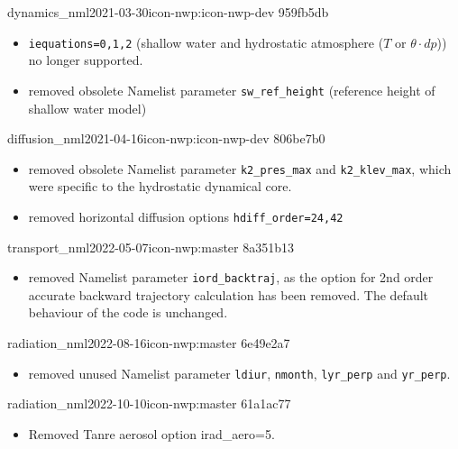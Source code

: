 \begin{changeitem}{dynamics\_nml}{2021-03-30}{icon-nwp:icon-nwp-dev 959fb5db}
  \begin{itemize}
   \item \texttt{iequations=0,1,2} (shallow water and hydrostatic atmosphere ($T$ or $\theta\cdot dp$)) no longer supported.
   \item removed obsolete Namelist parameter \texttt{sw\_ref\_height} (reference height of shallow water model)
  \end{itemize}
\end{changeitem}

\begin{changeitem}{diffusion\_nml}{2021-04-16}{icon-nwp:icon-nwp-dev 806be7b0}
  \begin{itemize}
   \item removed obsolete Namelist parameter \texttt{k2\_pres\_max} and \texttt{k2\_klev\_max}, which were specific to the hydrostatic dynamical core.
   \item removed horizontal diffusion options \texttt{hdiff\_order=24,42}
  \end{itemize}
\end{changeitem}

\begin{changeitem}{transport\_nml}{2022-05-07}{icon-nwp:master 8a351b13}
  \begin{itemize}
   \item removed Namelist parameter \texttt{iord\_backtraj}, as the option for 2nd order accurate backward trajectory calculation has been removed.
         The default behaviour of the code is unchanged.
  \end{itemize}
\end{changeitem}

\begin{changeitem}{radiation\_nml}{2022-08-16}{icon-nwp:master 6e49e2a7}
  \begin{itemize}
   \item removed unused Namelist parameter \texttt{ldiur}, \texttt{nmonth}, \texttt{lyr\_perp} and \texttt{yr\_perp}.
  \end{itemize}
\end{changeitem}

\begin{changeitem}{radiation\_nml}{2022-10-10}{icon-nwp:master 61a1ac77}
  \begin{itemize}
   \item Removed Tanre aerosol option irad\_aero=5.
  \end{itemize}
\end{changeitem}

